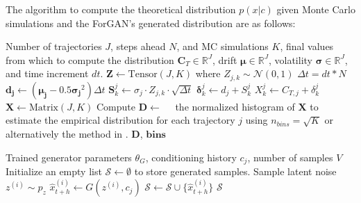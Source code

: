The algorithm to compute the theoretical distribution $p(x|c)$ given Monte Carlo simulations and the ForGAN's generated distribution are as follows:
\begin{algorithm}[H]
\caption{Monte Carlo generation of terminal distributions}
\label{alg:mc_terminal_dist}
\begin{algorithmic}[1]
\REQUIRE Number of trajectories $J$, steps ahead $N$, and MC simulations $K$, final values from which to compute the distribution $\mathbf{C}_T \in \mathbb{R}^J$, drift $\boldsymbol{\mu} \in \mathbb{R}^J$, volatility $\boldsymbol{\sigma} \in \mathbb{R}^J$, and time increment $ dt$.
\STATE {}
\STATE $\mathbf{Z} \leftarrow \text{Tensor}(J, K)$ where $Z_{j, k} \sim \mathcal{N}(0,1)$
\STATE $\Delta t = dt * N$
    \STATE {}
    \STATE $\mathbf{d_j} \leftarrow (\boldsymbol{\mu_j} - 0.5 \boldsymbol{\sigma_j}^2) \Delta t$ 
    \STATE {}
    \STATE $\mathbf{S}_{k}^j \leftarrow \sigma_j \cdot Z_{j, k} \cdot \sqrt{\Delta t}$
    \STATE {}
    \STATE $\boldsymbol{\delta}_{k}^j \leftarrow d_j + S_{k}^j$ 
        \STATE $X_{k}^j \leftarrow C_{T,j} + \delta_{k}^j$
    \ENDFOR
\ENDFOR
\STATE $\mathbf{X} \leftarrow \text{Matrix}(J, K)$
\STATE Compute $\mathbf{D} \leftarrow \quad$ the normalized histogram of $\mathbf{X}$ to estimate the empirical distribution for each trajectory $j$ using $n_{bins} = \sqrt{K}$ or alternatively the method in \cite{forgan:freedman_bins}.
\RETURN $\mathbf{D}$, $\mathbf{bins}$ 
\end{algorithmic}
\end{algorithm}






\begin{algorithm}[H]
\caption{ForGAN distribution inference}
\label{alg: forgan-inference}
\begin{algorithmic}[1]
\REQUIRE Trained generator parameters $\theta_G$, conditioning history $c_j$, number of samples $V$
\STATE Initialize an empty list $\mathcal{S} \leftarrow \emptyset$ to store generated samples.
    \STATE Sample latent noise $z^{(i)} \sim p_z$ 
    \STATE $\hat{x}_{t+h}^{(i)} \leftarrow G(z^{(i)}, c_j)$ 
    \STATE $\mathcal{S} \leftarrow \mathcal{S} \cup \{\hat{x}_{t+h}^{(i)}\}$
\ENDFOR
\RETURN $\mathcal{S}$ 
\end{algorithmic}
\end{algorithm}

